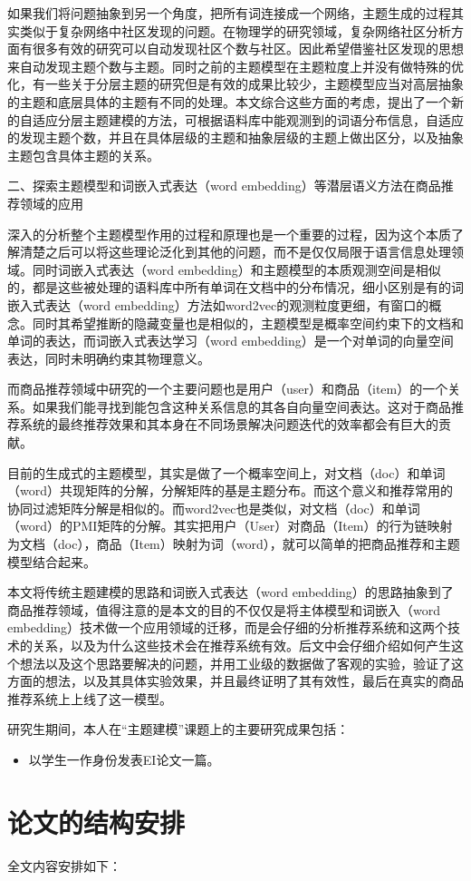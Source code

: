 如果我们将问题抽象到另一个角度，把所有词连接成一个网络，主题生成的过程其实类似于复杂网络中社区发现的问题。在物理学的研究领域，复杂网络社区分析方面有很多有效的研究可以自动发现社区个数与社区。因此希望借鉴社区发现的思想来自动发现主题个数与主题。同时之前的主题模型在主题粒度上并没有做特殊的优化，有一些关于分层主题的研究但是有效的成果比较少，主题模型应当对高层抽象的主题和底层具体的主题有不同的处理。本文综合这些方面的考虑，提出了一个新的自适应分层主题建模的方法，可根据语料库中能观测到的词语分布信息，自适应的发现主题个数，并且在具体层级的主题和抽象层级的主题上做出区分，以及抽象主题包含具体主题的关系。

二、探索主题模型和词嵌入式表达（word embedding）等潜层语义方法在商品推荐领域的应用

深入的分析整个主题模型作用的过程和原理也是一个重要的过程，因为这个本质了解清楚之后可以将这些理论泛化到其他的问题，而不是仅仅局限于语言信息处理领域。同时词嵌入式表达（word embedding）和主题模型的本质观测空间是相似的，都是这些被处理的语料库中所有单词在文档中的分布情况，细小区别是有的词嵌入式表达（word embedding）方法如word2vec\cite{word2vec}的观测粒度更细，有窗口的概念。同时其希望推断的隐藏变量也是相似的，主题模型是概率空间约束下的文档和单词的表达，而词嵌入式表达学习（word embedding）是一个对单词的向量空间表达，同时未明确约束其物理意义。

而商品推荐领域中研究的一个主要问题也是用户（user）和商品（item）的一个关系。如果我们能寻找到能包含这种关系信息的其各自向量空间表达。这对于商品推荐系统的最终推荐效果和其本身在不同场景解决问题迭代的效率都会有巨大的贡献。

目前的生成式的主题模型，其实是做了一个概率空间上，对文档（doc）和单词（word）共现矩阵的分解，分解矩阵的基是主题分布。而这个意义和推荐常用的协同过滤矩阵分解是相似的。而word2vec也是类似，对文档（doc）和单词（word）的PMI矩阵的分解。其实把用户（User）对商品（Item）的行为链映射为文档（doc），商品（Item）映射为词（word），就可以简单的把商品推荐和主题模型结合起来。

本文将传统主题建模的思路和词嵌入式表达（word embedding）的思路抽象到了商品推荐领域，值得注意的是本文的目的不仅仅是将主体模型和词嵌入（word embedding）技术做一个应用领域的迁移，而是会仔细的分析推荐系统和这两个技术的关系，以及为什么这些技术会在推荐系统有效。后文中会仔细介绍如何产生这个想法以及这个思路要解决的问题，并用工业级的数据做了客观的实验，验证了这方面的想法，以及其具体实验效果，并且最终证明了其有效性，最后在真实的商品推荐系统上上线了这一模型。

研究生期间，本人在“主题建模”课题上的主要研究成果包括：
  \begin{itemize}
  \item 以学生一作身份发表EI论文一篇。
  \end{itemize} 
\section{论文的结构安排}
全文内容安排如下：


%
%
